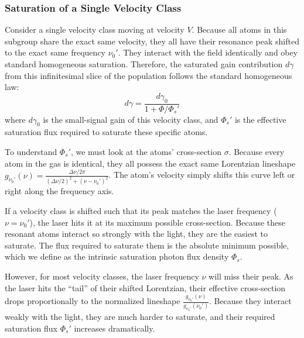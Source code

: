 \subsubsection*{Saturation of a Single Velocity Class}

Consider a single velocity class moving at velocity $V$. Because all atoms in this subgroup share the exact same velocity, they all have their resonance peak shifted to the exact same frequency $\nu_0'$. They interact with the field identically and obey standard homogeneous saturation. Therefore, the saturated gain contribution $d\gamma$ from this infinitesimal slice of the population follows the standard homogeneous law:
\begin{equation*}
    d\gamma = \frac{d\gamma_0}{1 + \Phi / \Phi_s'}
\end{equation*}
where $d\gamma_0$ is the small-signal gain of this velocity class, and $\Phi_s'$ is the effective saturation flux required to saturate these specific atoms.

To understand $\Phi_s'$, we must look at the atoms' cross-section $\sigma$. Because every atom in the gas is identical, they all possess the exact same Lorentzian lineshape $g_{\nu_0'}(\nu) = \frac{\Delta\nu/2\pi}{(\Delta\nu/2)^2 + (\nu - \nu_0')^2}$. The atom's velocity simply shifts this curve left or right along the frequency axis.

If a velocity class is shifted such that its peak matches the laser frequency ($\nu = \nu_0'$), the laser hits it at its maximum possible cross-section. Because these resonant atoms interact so strongly with the light, they are the easiest to saturate. The flux required to saturate them is the absolute minimum possible, which we define as the intrinsic saturation photon flux density $\Phi_s$.

However, for most velocity classes, the laser frequency $\nu$ will miss their peak. As the laser hits the ``tail'' of their shifted Lorentzian, their effective cross-section drops proportionally to the normalized lineshape $\frac{g_{\nu_0'}(\nu)}{g_{\nu_0'}(\nu_0')}$. Because they interact weakly with the light, they are much harder to saturate, and their required saturation flux $\Phi_s'$ increases dramatically.

